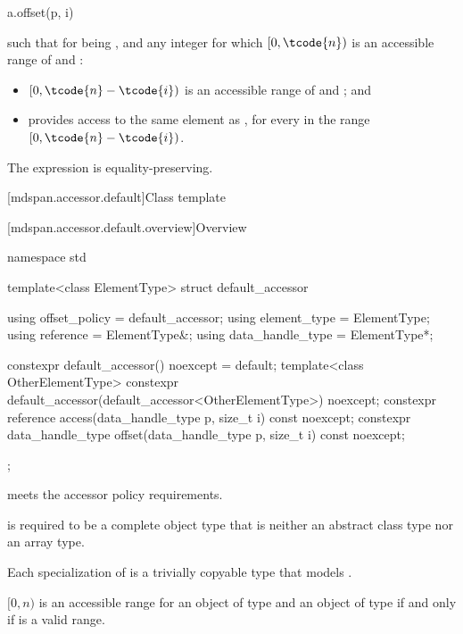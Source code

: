 \begin{itemdecl}
a.offset(p, i)
\end{itemdecl}

\begin{itemdescr}
\pnum
\result
{}

\pnum
\returns
{} such that for  being , and
any integer  for which $[0, \tcode{n})$ is
an accessible range of  and :
\begin{itemize}
\item
$[0, \tcode{n} - \tcode{i})$ is an accessible range of  and ; and
\item
{} provides access to
the same element as ,
for every  in the range $[0, \tcode{n} - \tcode{i})$.
\end{itemize}

\pnum
\remarks
The expression is equality-preserving.
\end{itemdescr}

[mdspan.accessor.default]{Class template }

[mdspan.accessor.default.overview]{Overview}

\begin{codeblock}
namespace std {
  template<class ElementType>
  struct default_accessor {
    using offset_policy = default_accessor;
    using element_type = ElementType;
    using reference = ElementType&;
    using data_handle_type = ElementType*;

    constexpr default_accessor() noexcept = default;
    template<class OtherElementType>
      constexpr default_accessor(default_accessor<OtherElementType>) noexcept;
    constexpr reference access(data_handle_type p, size_t i) const noexcept;
    constexpr data_handle_type offset(data_handle_type p, size_t i) const noexcept;
  };
}
\end{codeblock}

\pnum
{} meets the accessor policy requirements.

\pnum
{} is required to be a complete object type
that is neither an abstract class type nor an array type.

\pnum
Each specialization of  is
a trivially copyable type that models .

\pnum
$[0, n)$ is an accessible range for
an object  of type  and
an object of type 
if and only if  is a valid range.

